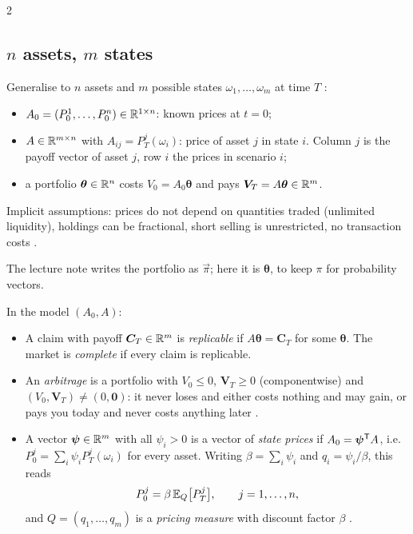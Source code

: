 \begin{paracol}{2}
\subsection{\texorpdfstring{$n$}{n} assets, \texorpdfstring{$m$}{m} states}
Generalise to $n$ assets and $m$ possible states $\omega_1,\dots,\omega_m$ at time $T$
:
\begin{itemize}
  \item $A_0=(P_0^1,\dots,P_0^n)\in\mathbb{R}^{1\times n}$: known prices at $t=0$;
  \item $A\in\mathbb{R}^{m\times n}$ with $A_{ij}=P_T^j(\omega_i)$: price of asset $j$ in state $i$. Column $j$ is the
        payoff vector of asset $j$, row $i$ the prices in scenario $i$;
  \item a portfolio $\bm\theta\in\mathbb{R}^n$ costs $V_0=A_0\bm\theta$ and pays $\bm V_T=A\bm\theta\in\mathbb{R}^m$.
\end{itemize}
Implicit assumptions: prices do not depend on quantities traded (unlimited liquidity), holdings
can be fractional, short selling is unrestricted, no transaction costs .

\begin{coursenote}[Notation]
The lecture note writes the portfolio as $\vec\pi$; here it is $\bm\theta$, to keep $\pi$ for
probability vectors.
\end{coursenote}

\begin{definition}\label{def:onepmodel}
In the model $(A_0,A)$:
\begin{itemize}
  \item A claim with payoff $\bm C_T\in\mathbb{R}^m$ is \emph{replicable} if $A\bm\theta=\bm C_T$ for some $\bm\theta$.
        The market is \emph{complete} if every claim is replicable.
  \item An \emph{arbitrage} is a portfolio with $V_0\le 0$, $\bm V_T\ge0$ (componentwise) and
        $(V_0,\bm V_T)\neq(0,\bm 0)$: it never loses and either costs nothing and may gain, or pays you
        today and never costs anything later .
  \item A vector $\bm\psi\in\mathbb{R}^m$ with all $\psi_i>0$ is a vector of \emph{state prices} if
        $A_0=\bm\psi^{\mathsf T} A$, i.e.\ $P_0^j=\sum_i\psi_iP_T^j(\omega_i)$ for every asset. Writing
        $\beta=\sum_i\psi_i$ and $q_i=\psi_i/\beta$, this reads
        \[
          P_0^j = \beta\,\mathbb{E}_Q\bigl[P_T^j\bigr],\qquad j=1,\dots,n,
        \]
        and $Q=(q_1,\dots,q_m)$ is a \emph{pricing measure} with discount factor $\beta$ .
\end{itemize}
\end{definition}


\end{paracol}
